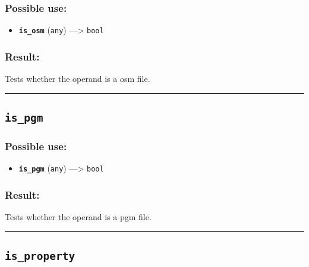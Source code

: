 \documentclass[]{book}
\providecommand{\tightlist}{%
  \setlength{\itemsep}{0pt}\setlength{\parskip}{0pt}}
\theoremstyle{definition}
\theoremstyle{definition}
\theoremstyle{definition}
\theoremstyle{remark}
\begin{document}
\subsubsection{Possible use:}\label{possible-use-298}

\begin{itemize}
\tightlist
\item
  \textbf{\texttt{is\_osm}} (\texttt{any}) ---\textgreater{}
  \texttt{bool}
\end{itemize}

\subsubsection{Result:}\label{result-288}

Tests whether the operand is a osm file.

\begin{center}\rule{0.5\linewidth}{\linethickness}\end{center}

\subsection{\texorpdfstring{\texttt{is\_pgm}}{is\_pgm}}\label{is_pgm}

\subsubsection{Possible use:}\label{possible-use-299}

\begin{itemize}
\tightlist
\item
  \textbf{\texttt{is\_pgm}} (\texttt{any}) ---\textgreater{}
  \texttt{bool}
\end{itemize}

\subsubsection{Result:}\label{result-289}

Tests whether the operand is a pgm file.

\begin{center}\rule{0.5\linewidth}{\linethickness}\end{center}

\subsection{\texorpdfstring{\texttt{is\_property}}{is\_property}}\label{is_property}
\end{document}
